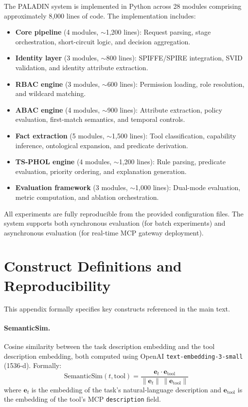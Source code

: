 \documentclass[10pt,a4paper,twocolumn]{article}
\begin{document}
The PALADIN system is implemented in Python across 28 modules comprising approximately 8,000 lines of code. The implementation includes:

\begin{itemize}
  \item \textbf{Core pipeline} (4 modules, $\sim$1,200 lines): Request parsing, stage orchestration, short-circuit logic, and decision aggregation.
  \item \textbf{Identity layer} (3 modules, $\sim$800 lines): SPIFFE/SPIRE integration, SVID validation, and identity attribute extraction.
  \item \textbf{RBAC engine} (3 modules, $\sim$600 lines): Permission loading, role resolution, and wildcard matching.
  \item \textbf{ABAC engine} (4 modules, $\sim$900 lines): Attribute extraction, policy evaluation, first-match semantics, and temporal controls.
  \item \textbf{Fact extraction} (5 modules, $\sim$1,500 lines): Tool classification, capability inference, ontological expansion, and predicate derivation.
  \item \textbf{TS-PHOL engine} (4 modules, $\sim$1,200 lines): Rule parsing, predicate evaluation, priority ordering, and explanation generation.
  \item \textbf{Evaluation framework} (3 modules, $\sim$1,000 lines): Dual-mode evaluation, metric computation, and ablation orchestration.
\end{itemize}

All experiments are fully reproducible from the provided configuration files. The system supports both synchronous evaluation (for batch experiments) and asynchronous evaluation (for real-time MCP gateway deployment).

\clearpage
\section{Construct Definitions and Reproducibility}
\label{app:constructs}

This appendix formally specifies key constructs referenced in the main text.

\paragraph{SemanticSim.} Cosine similarity between the task description embedding and the tool description embedding, both computed using OpenAI \texttt{text-embedding-3-small} (1536-d). Formally:
\[
\text{SemanticSim}(t, \text{tool}) = \frac{\mathbf{e}_t \cdot \mathbf{e}_{\text{tool}}}{\|\mathbf{e}_t\| \, \|\mathbf{e}_{\text{tool}}\|}
\]
where $\mathbf{e}_t$ is the embedding of the task's natural-language description and $\mathbf{e}_{\text{tool}}$ is the embedding of the tool's MCP \texttt{description} field.
\end{document}
